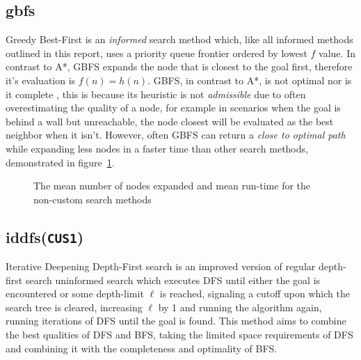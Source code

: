 \subsection{\texorpdfstring{\acrfull{gbfs}}{GBFS}} %
\label{sub:gbfs}
Greedy Best-First is an \textit{informed} search method which, like all informed methods outlined in this report, uses a priority queue frontier ordered by lowest $f$ value. In contrast to A*, GBFS expands the node that is closest to the goal first, therefore it's evaluation is $f(n)=h(n)$. GBFS, in contrast to A*, is not optimal nor is it complete \parencite{aiasa}, this is because its heuristic is not \textit{admissible} due to often overestimating the quality of a node, for example in scenarios when the goal is behind a wall but unreachable, the node closest will be evaluated as the best neighbor when it isn't. However, often GBFS can return a \textit{close to optimal path} while expanding less nodes in a faster time than other search methods, demonstrated in figure~\ref{fig:mean_runtime_expanded}.

\begin{figure}[H]
	\hfill
	\hfill
	\caption{The mean number of nodes expanded and mean run-time for the non-custom search methods}
	\label{fig:mean_runtime_expanded}
\end{figure}


\subsection{\texorpdfstring{\acrfull{iddfs}(\texttt{CUS1})}{IDDFS}} %
\label{sub:iddfs}
Iterative Deepening Depth-First search is an improved version of regular depth-first search uninformed search which executes DFS until either the goal is encountered or some depth-limit $\ell$ is reached, signaling a cutoff upon which the search tree is cleared, increasing $\ell$ by 1 and running the algorithm again, running iterations of DFS until the goal is found. This method aims to combine the best qualities of DFS and BFS, taking the limited space requirements of DFS and combining it with the completeness and optimality of BFS.

